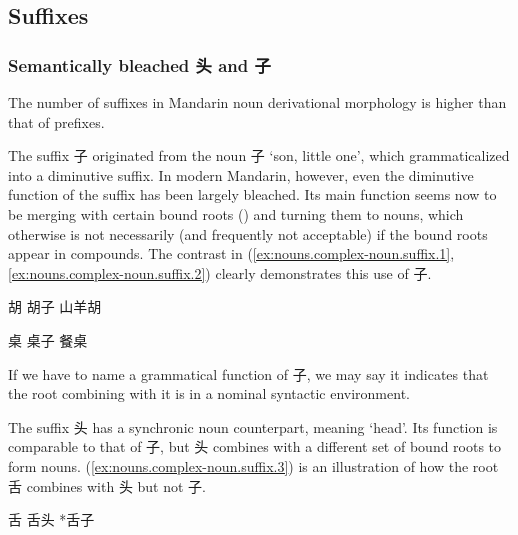 \documentclass[UTF8, a4paper, oneside, scheme=plain, 12pt]{ctexrep}
\newcommand{\translate}[1]{`#1'}
\begin{document}
\subsection{Suffixes}

\subsubsection{Semantically bleached 头 and 子}

The number of suffixes in Mandarin noun derivational morphology
is higher than that of prefixes.

The suffix 子 originated from the noun 子 \translate{son, little one},
which grammaticalized into a diminutive suffix.
In modern Mandarin, however, even the diminutive function of the suffix has been largely bleached.
Its main function seems now to be merging with certain bound roots
()
and turning them to nouns,
which otherwise is not necessarily (and frequently not acceptable)
if the bound roots appear in compounds.
The contrast in (\ref{ex:nouns.complex-noun.suffix.1}, \ref{ex:nouns.complex-noun.suffix.2})
clearly demonstrates this use of 子.

\begin{exe}
    \ex\label{ex:nouns.complex-noun.suffix.1} \begin{xlist}
        \ex *胡
        \ex 胡子
        \ex 山羊胡
    \end{xlist}
    
    \ex\label{ex:nouns.complex-noun.suffix.2} \begin{xlist}
        \ex *桌
        \ex 桌子
        \ex 餐桌
    \end{xlist}
\end{exe}


If we have to name a grammatical function of 子,
we may say it indicates that the root combining with it is in a nominal syntactic environment.

The suffix 头 has a synchronic noun counterpart, meaning \translate{head}.
Its function is comparable to that of 子,
but 头 combines with a different set of bound roots to form nouns.
(\ref{ex:nouns.complex-noun.suffix.3}) is an illustration
of how the root 舌 combines with 头 but not 子.

\begin{exe}
    \ex\label{ex:nouns.complex-noun.suffix.3} \begin{xlist}
        \ex *舌
        \ex 舌头
        \ex\label{ex:nouns.complex-noun.suffix.3.c} *舌子
    \end{xlist}
\end{exe}
\end{document}
